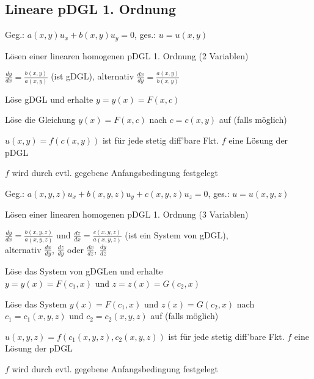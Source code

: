 \documentclass[german,color,5pt]{latex4ei/latex4ei_fs}
\begin{document}
\begin{sectionbox}
	\subsection{Lineare pDGL 1. Ordnung}
	Geg.: $a(x,y)u_x+b(x,y)u_y=0$, ges.: $u=u(x,y)$
	\begin{cookbox}{Lösen einer linearen homogenen pDGL 1. Ordnung (2 Variablen)}
		\item $\frac{dy}{dx}=\frac{b(x,y)}{a(x,y)}$ (ist gDGL), alternativ $\frac{dx}{dy}=\frac{a(x,y)}{b(x,y)}$ 
		\item Löse gDGL und erhalte $y=y(x)=F(x,c) $
		\item Löse die Gleichung $y(x)=F(x,c)$ nach $c = c(x,y)$ auf (falls möglich)
		\item $u(x,y)=f(c(x,y))$ ist für jede stetig diff'bare Fkt. $f$ eine Lösung der pDGL
		\item $f$ wird durch evtl. gegebene Anfangsbedingung festgelegt
	\end{cookbox}
	\label{subsubsec:linpdgl}
	Geg.: $a(x,y,z)u_x+b(x,y,z)u_y+c(x,y,z)u_z=0$, ges.: $u=u(x,y,z)$
	\begin{cookbox}{Lösen einer linearen homogenen pDGL 1. Ordnung (3 Variablen)}
		\item $\frac{dy}{dx}=\frac{b(x,y,z)}{a(x,y,z)}$ und $\frac{dz}{dx}=\frac{c(x,y,z)}{a(x,y,z)}$ (ist ein System von gDGL), \\
			alternativ $\frac{dx}{dy}$, $\frac{dz}{dy}$ oder $\frac{dx}{dz}$, $\frac{dy}{dz}$
		\item Löse das System von gDGLen und erhalte \\$y=y(x)=F(c_{1},x) $ und $z=z(x)=G(c_{2},x) $
		\item Löse das System $y(x)=F(c_{1},x) $ und $z(x)=G(c_{2},x) $ nach $c_{1}=c_{1}(x,y,z) $ und $c_{2}=c_{2}(x,y,z) $ auf (falls möglich)
		\item $ u(x,y,z)=f(c_{1}(x,y,z),c_{2}(x,y,z))$ ist für jede stetig diff'bare Fkt. $f$ eine Lösung der pDGL
		\item $f $ wird durch evtl. gegebene Anfangsbedingung festgelegt
	\end{cookbox}
\end{sectionbox}
\end{document}
